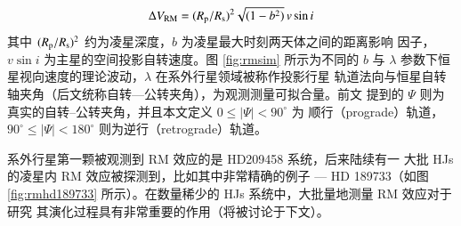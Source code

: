 \begin{equation} \label{eq:rvdvofrm}
\Delta V_\mathrm{RM} = (R_\mathrm{p} / R_\mathrm{s})^2 \sqrt{(1-b^2)} \, v\sin i
\end{equation} %
其中 $(R_\mathrm{p} / R_\mathrm{s})^2$ 约为凌星深度，$b$ 为凌星最大时刻两天体之间的距离影响
因子，$v\sin i$ 为主星的空间投影自转速度。图 \ref{fig:rmsim} 所示为不同的 $b$ 与 
$\lambda$ 参数下恒星视向速度的理论波动，$\lambda$ 在系外行星领域被称作投影行星
轨道法向与恒星自转轴夹角（后文统称自转---公转夹角），为观测测量可拟合量。前文
提到的 $\Psi$ 则为真实的自转--公转夹角，并且本文定义 $0 \leq |\Psi | < 90^\circ$ 为
顺行（prograde）轨道，$90^\circ \leq |\Psi | < 180^\circ $ 则为逆行（retrograde）轨道。


系外行星第一颗被观测到 RM 效应的是 HD209458 系统\cite{Queloz2000}，后来陆续有一
大批 HJs 的凌星内 RM 效应被探测到，比如其中非常精确的例子 --- HD 189733（如图 
\ref{fig:rmhd189733}  所示）。在数量稀少的 HJs 系统中，大批量地测量 RM 效应对于研究
其演化过程具有非常重要的作用（将被讨论于下文）。




